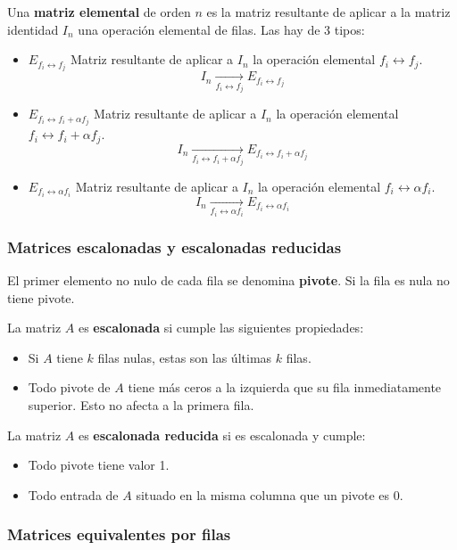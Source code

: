 Una \textbf{matriz elemental} de orden $n$ es la matriz resultante de aplicar a 
la matriz identidad $I_n$ una operación elemental de filas. Las hay de 3 tipos:
\begin{itemize}
 \item $E_{f_i \leftrightarrow f_j}$ Matriz resultante de aplicar a $I_n$ la 
operación elemental $f_i \leftrightarrow f_j$.
\[
 I_n \underset{f_i \leftrightarrow f_j}{\longrightarrow} E_{f_i \leftrightarrow 
f_j}
\]
 \item $E_{f_i \leftrightarrow f_i + \alpha f_j}$ Matriz resultante de aplicar 
a $I_n$ la operación elemental $f_i \leftrightarrow f_i + \alpha f_j$.
\[
 I_n \underset{f_i \leftrightarrow f_i + \alpha f_j}{\longrightarrow} E_{f_i 
\leftrightarrow f_i + \alpha f_j}
\]
 \item $E_{f_i \leftrightarrow \alpha f_i}$ Matriz resultante de aplicar 
a $I_n$ la operación elemental $f_i \leftrightarrow \alpha f_i$.
\[
 I_n \underset{f_i \leftrightarrow \alpha f_i}{\longrightarrow} E_{f_i 
\leftrightarrow \alpha f_i}
\]
\end{itemize}

\subsubsection{Matrices escalonadas y escalonadas reducidas}

El primer elemento no nulo de cada fila se denomina \textbf{pivote}. Si la fila 
es nula no tiene pivote.

La matriz $A$ es \textbf{escalonada} si cumple las siguientes propiedades:
\begin{itemize}
 \item Si $A$ tiene $k$ filas nulas, estas son las últimas $k$ filas.
 \item Todo pivote de $A$ tiene más ceros a la izquierda que su fila 
inmediatamente superior. Esto no afecta a la primera fila.
\end{itemize}

La matriz $A$ es \textbf{escalonada reducida} si es escalonada y cumple:
\begin{itemize}
 \item Todo pivote tiene valor 1.
 \item Todo entrada de $A$ situado en la misma columna que un pivote es 0.
\end{itemize}

\subsubsection{Matrices equivalentes por filas}

